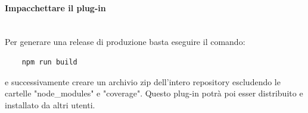 \paragraph{Impacchettare il plug-in}\mbox{}\\ [1mm]
Per generare una release di produzione basta eseguire il comando:
\begin{verbatim}
	npm run build	
\end{verbatim}
e successivamente creare un archivio zip dell'intero repository escludendo le cartelle "node\_modules" e "coverage". Questo plug-in potrà poi esser distribuito e installato da altri utenti. 
